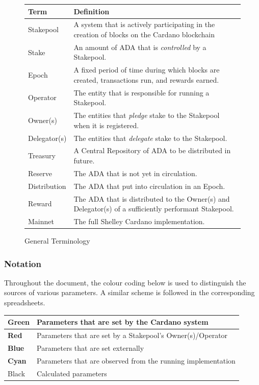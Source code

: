 \documentclass[11pt,a4paper,dvipsnames,twosided,final]{article}
\newcommand{\ada}{ADA{}}
\newcommand{\cardano}[1]{Cardano}
\begin{document}
\begin{figure}[t]
  \begin{center}
\begin{tabular}{||l|p{12cm}||}
  \hline \hline
\textbf{Term} & \textbf{Definition} \\\hline
  Stakepool & A system that is actively participating in the creation of blocks on the \cardano{} blockchain  \\\hline
  Stake & An amount of \ada{} that is \emph{controlled} by a Stakepool.\\\hline
  Epoch & A fixed period of time during which blocks are created, transactions run, and rewards earned.\\\hline
Operator & The entity that is responsible for running a Stakepool. \\\hline
Owner(s) & The entities that \emph{pledge} stake to the Stakepool when it is registered. \\\hline
  Delegator(s) & The entities that \emph{delegate} stake to the Stakepool.\\\hline
  Treasury & A Central Repository of \ada{} to be distributed in future.\\\hline
  Reserve & The \ada{} that is not yet in circulation.\\\hline
  Distribution & The \ada{} that put into circulation in an Epoch.\\\hline
  Reward & The \ada{} that is distributed to the Owner(s) and Delegator(s) of a sufficiently performant Stakepool.\\\hline
  Mainnet & The full Shelley \cardano{} implementation.\\\hline
  \hline
\end{tabular}
\end{center}
\caption{General Terminology}
\label{fig:terminology}
\end{figure}

\newpage
\subsubsection*{Notation}

Throughout the document, the colour coding below is used to distinguish the sources of various parameters.
A similar scheme is followed in the corresponding spreadsheets.

\begin{tabular}{||l|l||}\hline\hline
  \textbf{\color{green} Green} & Parameters that are set by the \cardano{} system \\\hline
  \textbf{\color{red} Red} & Parameters that are set by a Stakepool's Owner(s)/Operator \\\hline
  \textbf{\color{blue} Blue} & Parameters that are set externally \\\hline
  \textbf{\color{cyan} Cyan} & Parameters that are observed from the running implementation \\\hline
  Black & Calculated parameters \\\hline
\hline
\end{tabular}
\end{document}
